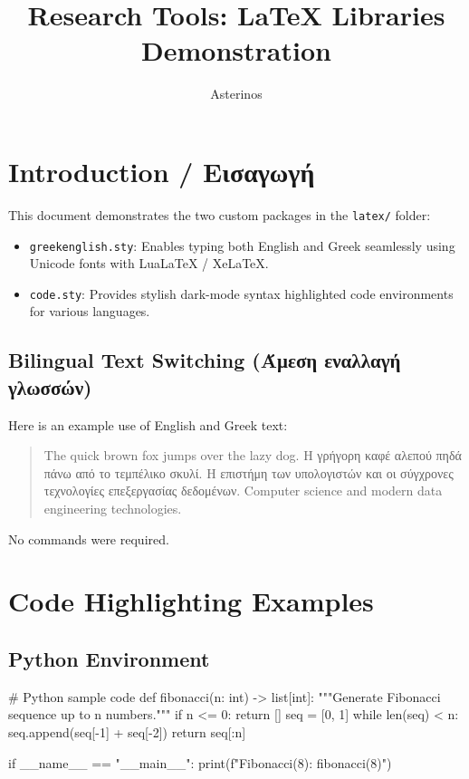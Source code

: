 \documentclass[11pt,a4paper]{article}
\title{\textbf{Research Tools: LaTeX Libraries Demonstration}}
\author{Asterinos}
\begin{document}
\maketitle

\section{Introduction / Εισαγωγή}
This document demonstrates the two custom packages in the \texttt{latex/} folder:
\begin{itemize}
    \item \texttt{greekenglish.sty}: Enables typing both English and Greek seamlessly using Unicode fonts with LuaLaTeX / XeLaTeX.
    \item \texttt{code.sty}: Provides stylish dark-mode syntax highlighted code environments for various languages.
\end{itemize}

\subsection{Bilingual Text Switching (Άμεση εναλλαγή γλωσσών)}
Here is an example use of English and Greek text:
\begin{quote}
    The quick brown fox jumps over the lazy dog. 
    Η γρήγορη καφέ αλεπού πηδά πάνω από το τεμπέλικο σκυλί. 
    Η επιστήμη των υπολογιστών και οι σύγχρονες τεχνολογίες επεξεργασίας δεδομένων.
    Computer science and modern data engineering technologies.
\end{quote}
No commands were required.

\section{Code Highlighting Examples}

\subsection{Python Environment}
\begin{python}
# Python sample code
def fibonacci(n: int) -> list[int]:
    """Generate Fibonacci sequence up to n numbers."""
    if n <= 0:
        return []
    seq = [0, 1]
    while len(seq) < n:
        seq.append(seq[-1] + seq[-2])
    return seq[:n]

if __name__ == "__main__":
    print(f"Fibonacci(8): {fibonacci(8)}")
\end{python}
\end{document}
